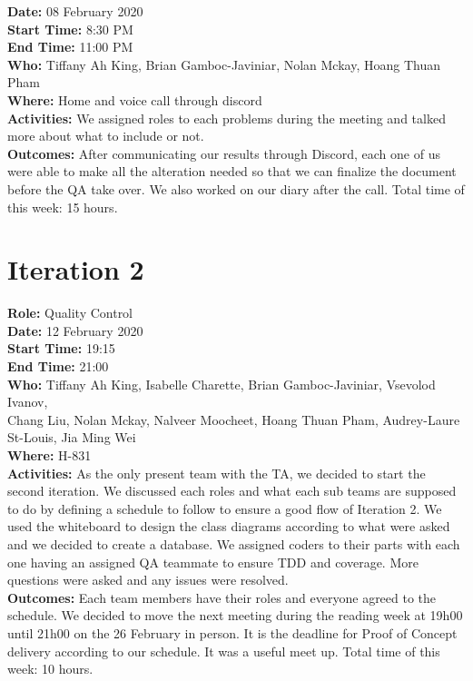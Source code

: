 \documentclass[12pt]{article}
\begin{document}
{\bf Date:} 08 February 2020\\
{\bf Start Time:} 8:30 PM\\
{\bf End Time:} 11:00 PM \\
{\bf Who:} Tiffany Ah King, Brian Gamboc-Javiniar, Nolan Mckay, Hoang Thuan Pham\\
{\bf Where:} Home and voice call through discord \\
{\bf Activities:} We assigned roles to each problems during the meeting and talked more about what to include or not. \\
{\bf Outcomes:} After communicating our results through Discord, each one of us were able to make all the alteration needed so that we can finalize the document before the QA take over. We also worked on our diary after the call. Total time of this week: 15 hours.\\



\section{Iteration 2}

{\bf Role:} Quality Control\\

{\bf Date:} 12 February 2020\\
{\bf Start Time:} 19:15\\
{\bf End Time:} 21:00\\
{\bf Who:} Tiffany Ah King, Isabelle Charette, Brian Gamboc-Javiniar, Vsevolod Ivanov,\\
Chang Liu, Nolan Mckay, Nalveer Moocheet, Hoang Thuan Pham, Audrey-Laure St-Louis, Jia Ming Wei\\
{\bf Where:} H-831\\
{\bf Activities:} As the only present team with the TA, we decided to start the second iteration. We discussed each roles and what each sub teams are supposed to do by defining a schedule to follow to ensure a good flow of Iteration 2. We used the whiteboard to design the class diagrams according to what were asked and we decided to create a database. We assigned coders to their parts with each one having an assigned QA teammate to ensure TDD and coverage. More questions were asked and any issues were resolved. \\
{\bf Outcomes:} Each team members have their roles and everyone agreed to the schedule. We decided to move the next meeting during the reading week at 19h00 until 21h00 on the 26 February in person. It is the deadline for Proof of Concept delivery according to our schedule. It was a useful meet up. Total time of this week: 10 hours.\\
\end{document}
